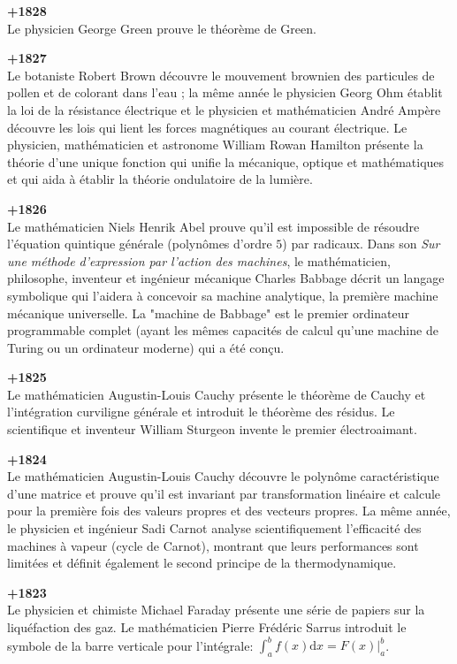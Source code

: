 \textbf{+1828}\\
Le physicien George Green prouve le théorème de Green.

\textbf{+1827}\\
Le botaniste Robert Brown découvre le mouvement brownien des particules de pollen et de colorant dans l'eau ; la même année le physicien Georg Ohm établit la loi de la résistance électrique et le physicien et mathématicien André Ampère découvre les lois qui lient les forces magnétiques au courant électrique. Le physicien, mathématicien et astronome William Rowan Hamilton présente la théorie d'une unique fonction qui unifie la mécanique, optique et mathématiques et qui aida à établir la théorie ondulatoire de la lumière.

\textbf{+1826}\\
Le mathématicien Niels Henrik Abel prouve qu'il est impossible de résoudre l'équation quintique générale (polynômes d'ordre $5$) par radicaux. Dans son \textit{Sur une méthode d'expression par l'action des machines}, le mathématicien, philosophe, inventeur et ingénieur mécanique Charles Babbage décrit un langage symbolique qui l'aidera à concevoir sa machine analytique, la première machine mécanique universelle. La "machine de Babbage" est le premier ordinateur programmable complet (ayant les mêmes capacités de calcul qu'une machine de Turing ou un ordinateur moderne) qui a été conçu.

\textbf{+1825}\\
Le mathématicien Augustin-Louis Cauchy présente le théorème de Cauchy et l'intégration curviligne générale et introduit le théorème des résidus. Le scientifique et inventeur William Sturgeon invente le premier électroaimant.

\textbf{+1824}\\
Le mathématicien Augustin-Louis Cauchy découvre le polynôme caractéristique d'une matrice et prouve qu'il est invariant par transformation linéaire et calcule pour la première fois des valeurs propres et des vecteurs propres. La même année, le physicien et ingénieur Sadi Carnot analyse scientifiquement l'efficacité des machines à vapeur (cycle de Carnot), montrant que leurs performances sont limitées et définit également le second principe de la thermodynamique.

\textbf{+1823}\\
Le physicien et chimiste Michael Faraday présente une série de papiers sur la liquéfaction des gaz.  Le mathématicien Pierre Frédéric Sarrus introduit le symbole de la barre verticale pour l'intégrale: $\int_a^b f(x)\mathrm{d}x= F(x)|_a^b$.

